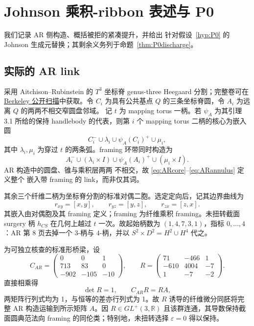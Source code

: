 \section{Johnson 乘积-ribbon 表述与 P0}\label{sec:johnson-presentation}

我们记录 AR 侧构造、概括被拒的紧凑提升，并给出
针对假设~\ref{hyp:P0} 的 Johnson 生成元替换；其剩余义务列于命题~\ref{thm:P0discharge}。

\subsection{实际的 AR link}

采用 Aitchison--Rubinstein
\cite[pp.~5--12]{AitchisonRubinstein1984} 的 $T^3$ 坐标脊 genus-three Heegaard 分割；完整卷可在
\href{https://math.berkeley.edu/~kirby/papers/Gordon%20and%20Kirby%20%28editors%29%20-%20Four-manifold%20theory%20%28Durham%29%20-%20MR0780574.pdf}
{Berkeley 公开扫描}中获取。令
$C_i$ 为具有公共基点 $Q$ 的三条坐标脊圆，令
$A_i$ 为远离 $Q$ 的两两不相交窄圆盘邻域。
记 $t$ 为 mapping torus 一柄。若 $\psi_A$ 为其引理 3.1 所给的保持 handlebody 的代表，则第 $i$ 个 mapping torus 二柄的核心为嵌入圆
\begin{equation}\label{eq:ARcore}
C_i^-\cup\lambda_i\cup\psi_A(C_i)^+\cup\mu_i,
\end{equation}
其中 $\lambda_i,\mu_i$ 为穿过 $t$ 的两条弧。framing 环带同时构造为
\begin{equation}\label{eq:ARannulus}
A_i^-\cup(\lambda_i\times I)\cup\psi_A(A_i)^+
       \cup(\mu_i\times I).
\end{equation}
AR 构造中的圆盘、锥与乘积层两两
不相交，故 \eqref{eq:ARcore}--\eqref{eq:ARannulus} 定义整个
嵌入带 framing 的 link，而非仅其词。

其余三个纤维二柄为坐标脊分割的标准对偶二胞。选定定向后，记其边界曲线为
\[
r_{xy}=[x,y],\qquad r_{yz}=[y,z],\qquad r_{zx}=[z,x].
\]
其嵌入由对偶胞及其 framing 定义；framing 为纤维乘积 framing。未扭转截面 surgery 柄 $h_{CS}$ 在几何上越过 $t$ 一次。故起始柄数为
$(1,4,7,3,1)$，指标 $0,\ldots,4$：AR 第 8 页去掉一个 $3$-柄与
$4$-柄，并以 $S^2\times D^2=H^2\cup H^4$ 代之。

为可独立核查的标准形桥梁，设
\[
C_{AR}=\begin{pmatrix}0&0&1\\713&83&0\\-902&-105&-10\end{pmatrix},
\qquad
R=\begin{pmatrix}71&-466&1\\-610&4004&-7\\1&-7&-2\end{pmatrix}.
\]
直接相乘得
\[
\det R=1,\qquad C_{AR}R=RA,
\]
两矩阵行列式均为 1，与恒等的差亦行列式为 1。故 $R$ 诱导的纤维微分同胚将完整 AR 构造运输到所示矩阵 $A$。因
$R\in GL^+(3,\mathbb R)$ 且该群连通，其导数保持截面圆典范法向 framing 的同伦类；特别地，未扭转选择 $\varepsilon=0$ 得以保持。


